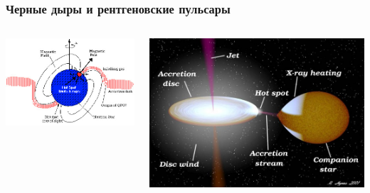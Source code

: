 \documentclass[10pt, pdf, hyperref={unicode}]{beamer}
\begin{document}
	\begin{frame}
		
		\frametitle{Черные дыры и рентгеновские пульсары}
		
		\begin{columns}[T]
			
			\begin{column}{0.5\textwidth}
				\includegraphics[width = \textwidth]{xray_pulsar.jpg}
			\end{column}
			
			\begin{column}{0.5\textwidth}
				\includegraphics[width = \textwidth]{black_hole.jpg}
			\end{column}
		
		\end{columns}
		
	\end{frame}		
\end{document}
